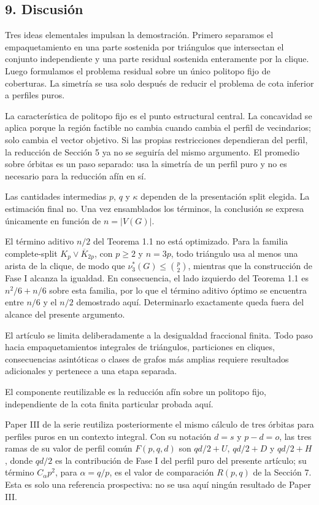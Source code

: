 \documentclass[
  spanish,
  11pt,
  a4paper,
]{article}
\begin{document}
\subsection{9. Discusión}\label{discusiuxf3n}

Tres ideas elementales impulsan la demostración. Primero separamos el empaquetamiento en una parte sostenida por triángulos que intersectan el conjunto independiente y una parte residual sostenida enteramente por la clique. Luego formulamos el problema residual sobre un único politopo fijo de coberturas. La simetría se usa solo después de reducir el problema de cota inferior a perfiles puros.

La característica de politopo fijo es el punto estructural central. La concavidad se aplica porque la región factible no cambia cuando cambia el perfil de vecindarios; solo cambia el vector objetivo. Si las propias restricciones dependieran del perfil, la reducción de Sección 5 ya no se seguiría del mismo argumento. El promedio sobre órbitas es un paso separado: usa la simetría de un perfil puro y no es necesario para la reducción afín en sí.

Las cantidades intermedias \(p\), \(q\) y \(\kappa\) dependen de la presentación split elegida. La estimación final no. Una vez ensamblados los términos, la conclusión se expresa únicamente en función de \(n=|V(G)|\).

El término aditivo \(n/2\) del Teorema 1.1 no está optimizado. Para la familia complete-split \(K_p\vee\overline{K}_{2p}\), con \(p\ge2\) y \(n=3p\), todo triángulo usa al menos una arista de la clique, de modo que \(\nu_3^*(G)\le\binom p2\), mientras que la construcción de Fase I alcanza la igualdad. En consecuencia, el lado izquierdo del Teorema 1.1 es \(n^2/6+n/6\) sobre esta familia, por lo que el término aditivo óptimo se encuentra entre \(n/6\) y el \(n/2\) demostrado aquí. Determinarlo exactamente queda fuera del alcance del presente argumento.

El artículo se limita deliberadamente a la desigualdad fraccional finita. Todo paso hacia empaquetamientos integrales de triángulos, particiones en cliques, consecuencias asintóticas o clases de grafos más amplias requiere resultados adicionales y pertenece a una etapa separada.

El componente reutilizable es la reducción afín sobre un politopo fijo, independiente de la cota finita particular probada aquí.

Paper III de la serie reutiliza posteriormente el mismo cálculo de tres órbitas para perfiles puros en un contexto integral. Con su notación \(d=s\) y \(p-d=o\), las tres ramas de su valor de perfil común \(F(p,q,d)\) son \(qd/2+U\), \(qd/2+D\) y \(qd/2+H\), donde \(qd/2\) es la contribución de Fase I del perfil puro del presente artículo; su término \(C_\alpha p^2\), para \(\alpha=q/p\), es el valor de comparación \(R(p,q)\) de la Sección 7. Esta es solo una referencia prospectiva: no se usa aquí ningún resultado de Paper III.
\end{document}
